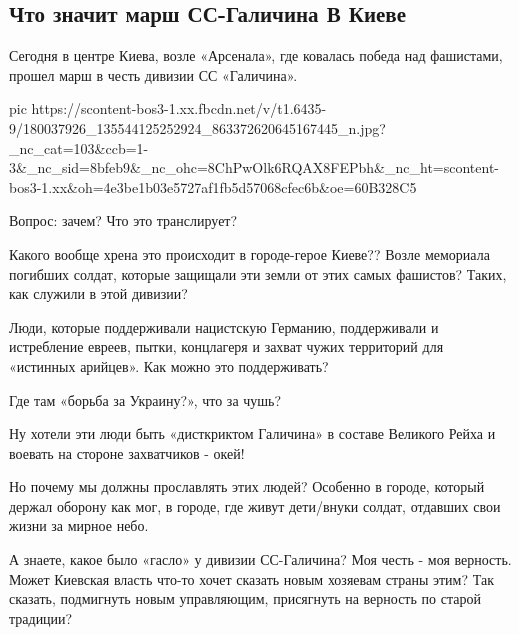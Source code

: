  
 
 
 
 

\subsection{Что значит марш СС-Галичина В Киеве}
\label{sec:28_04_2021.fb.zharkih_ekaterina.1.ss_galichina_kiev}

Сегодня в центре Киева, возле «Арсенала», где ковалась победа над фашистами,
прошел марш в честь дивизии СС «Галичина». 

\ifcmt
  pic https://scontent-bos3-1.xx.fbcdn.net/v/t1.6435-9/180037926_135544125252924_863372620645167445_n.jpg?_nc_cat=103&ccb=1-3&_nc_sid=8bfeb9&_nc_ohc=8ChPwOlk6RQAX8FEPbh&_nc_ht=scontent-bos3-1.xx&oh=4e3be1b03e5727af1fb5d57068cfec6b&oe=60B328C5
\fi

Вопрос: зачем? Что это транслирует?

Какого вообще хрена это происходит в городе-герое Киеве?? Возле мемориала
погибших солдат, которые защищали эти земли от этих самых фашистов? Таких, как
служили в этой дивизии? 

Люди, которые поддерживали нацистскую Германию, поддерживали и истребление
евреев, пытки, концлагеря и захват чужих территорий для «истинных арийцев». Как
можно это поддерживать? 

Где там «борьба за Украину?», что за чушь?

Ну хотели эти люди быть «дисткриктом Галичина» в составе Великого Рейха и
воевать на стороне захватчиков - окей! 

Но почему мы должны прославлять этих людей? Особенно в городе, который держал
оборону как мог, в городе, где живут дети/внуки солдат, отдавших свои жизни за
мирное небо.

А знаете, какое было «гасло» у дивизии СС-Галичина? Моя честь - моя верность.
Может Киевская власть что-то хочет сказать новым хозяевам страны этим? Так
сказать, подмигнуть новым управляющим, присягнуть на верность по старой
традиции? 

